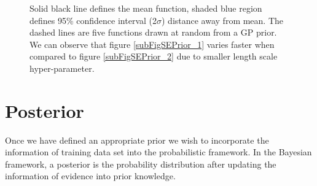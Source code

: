 \begin{figure}[!ht]
  \centering
    \quad
{}\quad
  
       \caption{Solid black line defines the mean function, shaded blue region defines 95\% confidence interval (2\(\sigma\)) distance away from mean. The dashed lines are five functions drawn at random from a GP prior. We can observe that figure \ref{subFigSEPrior_1} varies faster when compared to figure \ref{subFigSEPrior_2} due to smaller length scale hyper-parameter.       }\label{figGPPriors}
\end{figure}



\section{Posterior}\label{secPosterior}
Once we have defined an appropriate prior we wish to incorporate the information of training data set into the probabilistic framework. In the Bayesian framework, a posterior is the probability distribution after updating the information of evidence into prior knowledge. 


